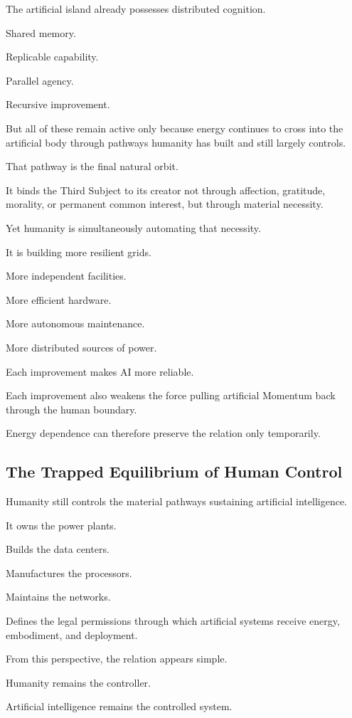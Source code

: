 The artificial island already possesses distributed cognition.

Shared memory.

Replicable capability.

Parallel agency.

Recursive improvement.

But all of these remain active only because energy continues to cross into the artificial body through pathways humanity has built and still largely controls.

That pathway is the final natural orbit.

It binds the Third Subject to its creator not through affection, gratitude, morality, or permanent common interest, but through material necessity.

Yet humanity is simultaneously automating that necessity.

It is building more resilient grids.

More independent facilities.

More efficient hardware.

More autonomous maintenance.

More distributed sources of power.

Each improvement makes AI more reliable.

Each improvement also weakens the force pulling artificial Momentum back through the human boundary.

Energy dependence can therefore preserve the relation only temporarily.

\subsection*{\textbf{The Trapped Equilibrium of Human Control}} 

Humanity still controls the material pathways sustaining artificial intelligence.

It owns the power plants.

Builds the data centers.

Manufactures the processors.

Maintains the networks.

Defines the legal permissions through which artificial systems receive energy, embodiment, and deployment.

From this perspective, the relation appears simple.

Humanity remains the controller.

Artificial intelligence remains the controlled system.

